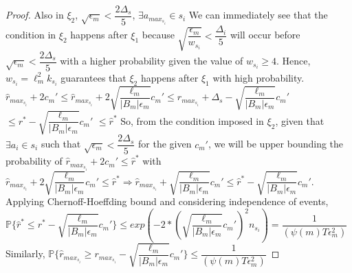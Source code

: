 \begin{proof}
\newline Also in $\xi_{2}$, $\sqrt{\epsilon_{m}}<\dfrac{2\Delta_{s}}{5}$, $\exists a_{max_{s_{i}}}\in s_{i}$
\newline We can immediately see that the condition in $\xi_{2}$ happens after $\xi_{1}$ because $\sqrt{\dfrac{\epsilon_{m}}{w_{s_{i}}}}<\dfrac{\Delta_{i}}{5}$ will occur before $\sqrt{\epsilon_{m}}<\dfrac{2\Delta_{s}}{5}$ with a higher probability given the value of $w_{s_{i}}\geq 4$. Hence, $w_{s_{i}}=\ell_{m}^{2}k_{s_{i}}$ guarantees that $\xi_{2}$ happens after $\xi_{1}$ with high probability.
\newline
$\hat{r}_{max_{s_{i}}} + 2c_{m}'\leq\hat{r}_{max_{s_{i}}} + 2\sqrt{\dfrac{\ell_{m}}{|B_{m}|\epsilon_{m}}}c_{m}'\leq r_{max_{s_{i}}} + \Delta_{s}-\sqrt{\dfrac{\ell_{m}}{|B_{m}|\epsilon_{m}}}c_{m}'$
\newline\hspace*{14em}$\leq r^{*}-\sqrt{\dfrac{\ell_{m}}{|B_{m}|\epsilon_{m}}}c_{m}'$
\newline\hspace*{14em}$\leq \hat{r}^{*}$
\newline
So, from the condition imposed in $\xi_{2}$, given that $\exists a_{i}\in s_{i}$ such that $\sqrt{\epsilon_{m}}<\dfrac{2\Delta_{s}}{5}$ for the given $c_{m}'$, we will be upper bounding the probability of $\hat{r}_{max_{s_{i}}} + 2c_{m}'\leq\hat{r}^{*}$ with $\hat{r}_{max_{s_{i}}} + 2\sqrt{\dfrac{\ell_{m}}{|B_{m}|\epsilon_{m}}}c_{m}'\leq \hat{r}^{*}\Rightarrow\hat{r}_{max_{s_{i}}} + \sqrt{\dfrac{\ell_{m}}{|B_{m}|\epsilon_{m}}}c_{m}'\leq \hat{r}^{*}-\sqrt{\dfrac{\ell_{m}}{|B_{m}|\epsilon_{m}}}c_{m}'$.
\newline
Applying Chernoff-Hoeffding bound and considering independence of events,
\newline
$\mathbb{P}\lbrace\hat{r}^{*}\leq r^{*} - \sqrt{\dfrac{\ell_{m}}{|B_{m}|\epsilon_{m}}}c_{m}'\rbrace\leq exp(-2*(\sqrt{\dfrac{\ell_{m}}{|B_{m}|\epsilon_{m}}}c_{m}')^{2}n_{s_{i}})=\dfrac{1}{ (\psi(m)T\epsilon_{m}^{2})}$
\newline
Similarly, $\mathbb{P}\lbrace\hat{r}_{max_{s_{i}}}\geq r_{max_{s_{i}}} - \sqrt{\dfrac{\ell_{m}}{|B_{m}|\epsilon_{m}}}c_{m}'\rbrace\leq\dfrac{1}{ (\psi(m)T\epsilon_{m}^{2})}$

\end{proof}
